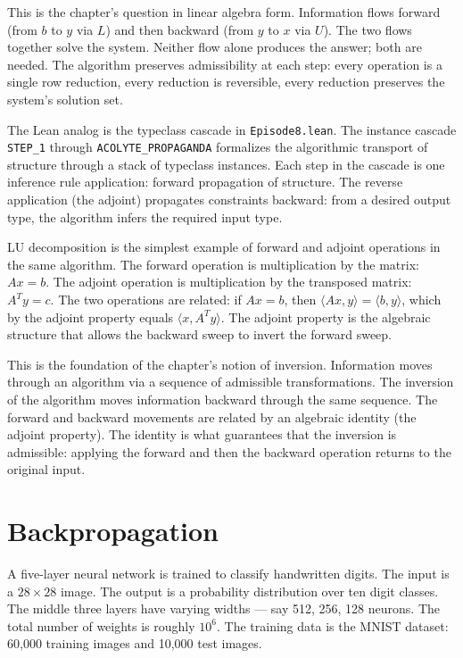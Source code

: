 This is the chapter's question in linear algebra form. Information
flows forward (from $b$ to $y$ via $L$) and then backward (from $y$
to $x$ via $U$). The two flows together solve the system. Neither
flow alone produces the answer; both are needed. The algorithm
preserves admissibility at each step: every operation is a single
row reduction, every reduction is reversible, every reduction
preserves the system's solution set.

The Lean analog is the typeclass cascade in \texttt{Episode8.lean}.
The instance cascade \texttt{STEP\_1} through
\texttt{ACOLYTE\_PROPAGANDA} formalizes the algorithmic transport
of structure through a stack of typeclass instances. Each step in
the cascade is one inference rule application: forward propagation
of structure. The reverse application (the adjoint) propagates
constraints backward: from a desired output type, the algorithm
infers the required input type.

LU decomposition is the simplest example of forward and adjoint
operations in the same algorithm. The forward operation is
multiplication by the matrix: $Ax = b$. The adjoint operation is
multiplication by the transposed matrix: $A^T y = c$. The two
operations are related: if $A x = b$, then $\langle A x, y
\rangle = \langle b, y \rangle$, which by the adjoint property
equals $\langle x, A^T y \rangle$. The adjoint property is the
algebraic structure that allows the backward sweep to invert the
forward sweep.

This is the foundation of the chapter's notion of inversion.
Information moves through an algorithm via a sequence of admissible
transformations. The inversion of the algorithm moves information
backward through the same sequence. The forward and backward
movements are related by an algebraic identity (the adjoint
property). The identity is what guarantees that the inversion is
admissible: applying the forward and then the backward operation
returns to the original input.

\section{Backpropagation}
\label{se:backpropagation}

A five-layer neural network is trained to classify handwritten digits.
The input is a $28 \times 28$ image. The output is a probability
distribution over ten digit classes. The middle three layers have
varying widths --- say 512, 256, 128 neurons. The total number of
weights is roughly $10^6$. The training data is the MNIST dataset:
60,000 training images and 10,000 test images.

